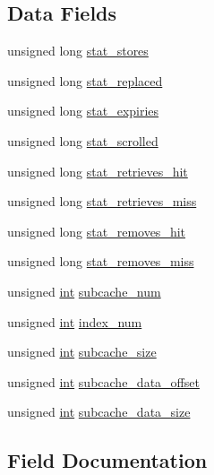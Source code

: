 \subsection*{Data Fields}
\begin{DoxyCompactItemize}
\item 
unsigned long \hyperlink{structSHMCBHeader_aad5991a06592dd8651bc3ae0a816ecf2}{stat\+\_\+stores}
\item 
unsigned long \hyperlink{structSHMCBHeader_a4d7a0a336cf38779b444360ec6030089}{stat\+\_\+replaced}
\item 
unsigned long \hyperlink{structSHMCBHeader_a5380756fe78e2dec1904efdd8c54231c}{stat\+\_\+expiries}
\item 
unsigned long \hyperlink{structSHMCBHeader_aaf8b10fbafbcf995c94cade0c2bd22a6}{stat\+\_\+scrolled}
\item 
unsigned long \hyperlink{structSHMCBHeader_a906ca78f74c7515104ff45f75fbef117}{stat\+\_\+retrieves\+\_\+hit}
\item 
unsigned long \hyperlink{structSHMCBHeader_aadbd88d742836199c9ce7bee090024b8}{stat\+\_\+retrieves\+\_\+miss}
\item 
unsigned long \hyperlink{structSHMCBHeader_acee38d38dfbb2dc4498b17682769956c}{stat\+\_\+removes\+\_\+hit}
\item 
unsigned long \hyperlink{structSHMCBHeader_aa8ab603a8c5c16b0d3b2c34af1e23ec1}{stat\+\_\+removes\+\_\+miss}
\item 
unsigned \hyperlink{pcre_8txt_a42dfa4ff673c82d8efe7144098fbc198}{int} \hyperlink{structSHMCBHeader_aecd6ac7a36b1519911ade50206a78dc8}{subcache\+\_\+num}
\item 
unsigned \hyperlink{pcre_8txt_a42dfa4ff673c82d8efe7144098fbc198}{int} \hyperlink{structSHMCBHeader_a054b839c8cf784f0d7dde28342b9fd82}{index\+\_\+num}
\item 
unsigned \hyperlink{pcre_8txt_a42dfa4ff673c82d8efe7144098fbc198}{int} \hyperlink{structSHMCBHeader_a8718c2d5613f4e4991f414a3cb4e0583}{subcache\+\_\+size}
\item 
unsigned \hyperlink{pcre_8txt_a42dfa4ff673c82d8efe7144098fbc198}{int} \hyperlink{structSHMCBHeader_a068f79c5e57db74c6379ab4f4c5159b5}{subcache\+\_\+data\+\_\+offset}
\item 
unsigned \hyperlink{pcre_8txt_a42dfa4ff673c82d8efe7144098fbc198}{int} \hyperlink{structSHMCBHeader_a347df91d5d5a8cbfc75ebe2cf94a4afa}{subcache\+\_\+data\+\_\+size}
\end{DoxyCompactItemize}


\subsection{Field Documentation}

